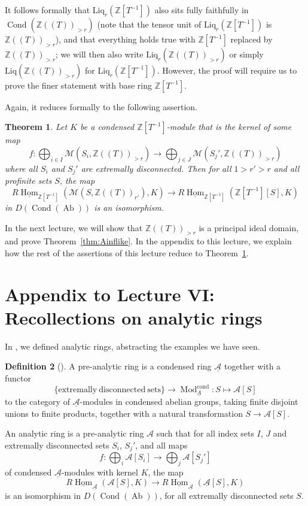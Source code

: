 \documentclass[11pt]{amsbook}
\DeclareMathOperator{\Hom}{Hom}
\newcommand{\intHom}{\underline{\Hom}}
\DeclareMathOperator{\Mod}{Mod}
\DeclareMathOperator{\Cond}{Cond}
\DeclareMathOperator{\Ab}{Ab}
\numberwithin{equation}{section}
\newtheorem{theorem}{Theorem}
\numberwithin{theorem}{section}
\theoremstyle{definition}
\newtheorem{definition}[theorem]{Definition}
\begin{document}
It follows formally that $\mathrm{Liq}_r(\mathbb Z[T^{-1}])$ also sits fully faithfully in $\Cond(\mathbb Z((T))_{>r})$ (note that the tensor unit of $\mathrm{Liq}_r(\mathbb Z[T^{-1}])$ is $\mathbb Z((T))_{>r}$), and that everything holds true with $\mathbb Z[T^{-1}]$ replaced by $\mathbb Z((T))_{>r}$; we will then also write $\mathrm{Liq}_r(\mathbb Z((T))_{>r})$ or simply $\mathrm{Liq}(\mathbb Z((T))_{>r})$ for $\mathrm{Liq}_r(\mathbb Z[T^{-1}])$. However, the proof will require us to prove the finer statement with base ring $\mathbb Z[T^{-1}]$.

Again, it reduces formally to the following assertion.

\begin{theorem}\label{thm:key} Let $K$ be a condensed $\mathbb Z[T^{-1}]$-module that is the kernel of some map
\[
f: \bigoplus_{i\in I} \mathcal M(S_i,\mathbb Z((T))_{>r})\to \bigoplus_{j\in J} \mathcal M(S_j',\mathbb Z((T))_{>r})
\]
where all $S_i$ and $S_j'$ are extremally disconnected. Then for all $1>r'>r$ and all profinite sets $S$, the map
\[
R\intHom_{\mathbb Z[T^{-1}]}(\mathcal M(S,\mathbb Z((T))_{r'}),K)\to R\intHom_{\mathbb Z[T^{-1}]}(\mathbb Z[T^{-1}][S],K)
\]
in $D(\Cond(\Ab))$ is an isomorphism.
\end{theorem}

In the next lecture, we will show that $\mathbb Z((T))_{>r}$ is a principal ideal domain, and prove Theorem~\ref{thm:Ainflike}. In the appendix to this lecture, we explain how the rest of the assertions of this lecture reduce to Theorem~\ref{thm:key}.

\newpage

\section*{Appendix to Lecture VI: Recollections on analytic rings}

In \cite[Lecture VII]{Condensed}, we defined analytic rings, abstracting the examples we have seen.

\begin{definition}[{\cite[Definition 7.1, 7.4]{Condensed}}] A pre-analytic ring is a condensed ring $\underline{\mathcal A}$ together with a functor
\[
\{\mathrm{extremally\ disconnected\ sets}\}\to \Mod_{\underline{A}}^{\mathrm{cond}}: S\mapsto \mathcal A[S]
\]
to the category of $\underline{\mathcal A}$-modules in condensed abelian groups, taking finite disjoint unions to finite products, together with a natural transformation $S\to \mathcal A[S]$.

An analytic ring is a pre-analytic ring $\mathcal A$ such that for all index sets $I$, $J$ and extremally disconnected sets $S_i$, $S_j'$, and all maps
\[
f: \bigoplus_i \mathcal A[S_i]\to \bigoplus_j \mathcal A[S_j']
\]
of condensed $\underline{\mathcal A}$-modules with kernel $K$, the map
\[
R\intHom_{\underline{\mathcal A}}(\mathcal A[S],K)\to R\intHom_{\underline{\mathcal A}}(\underline{\mathcal A}[S],K)
\]
is an isomorphism in $D(\Cond(\Ab))$, for all extremally disconnected sets $S$.
\end{definition}
\end{document}

